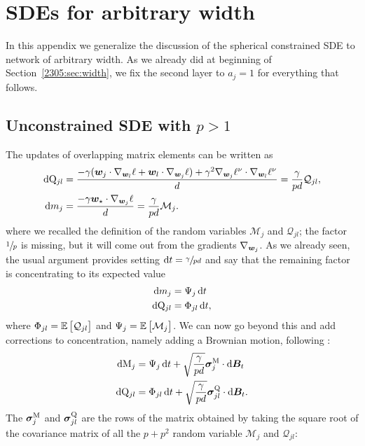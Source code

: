 \section{SDEs for arbitrary width}

\label{2305:app:SDE_with_generic_width}
In this appendix we generalize the discussion of the spherical constrained SDE to network of arbitrary width.
As we already did at beginning of Section~\ref{2305:sec:width}, we fix the second layer to \(a_j=1\) for everything that follows.
\subsection{Unconstrained SDE with \texorpdfstring{$p>1$}{p>1}}
The updates of overlapping matrix elements can be written as
\[\begin{split}
  \dif \Q_{jl} &= \frac{-\gamma (\w_j\cdot\nabla_{\w_l}{\ell}+\w_l\cdot\nabla_{\w_j}{\ell}) + \gamma^2\nabla_{\w_j}{\loss}\cdot\nabla_{\w_l}{\loss}}{d} = \frac{\gamma}{pd} \mathcal{Q}_{jl}, \\
  \dif m_{j} &= \frac{-\gamma \w_\star\cdot\nabla_{\w_j}\ell}{d}  = \frac{\gamma}{pd} \mathcal{M}_{j}.
\end{split}\]
where we recalled the definition of the random variables \(\mathcal{M}_{j}\) and \(\mathcal{Q}_{jl}\); the factor \(\sfrac1p\) is missing, but it will come out from the gradients \(\nabla_{{\boldsymbol{w}}_j}\).
As we already seen, the usual argument provides setting \(\dif t = \sfrac{\gamma}{pd}\) and say that the remaining factor is concentrating to its expected value
\[\begin{split}
    \dif m_{j} &= \Psi_{j} \dif t \\
    \dif \Q_{jl} &= \Phi_{jl} \dif t,
\end{split}\]
where \(\Phi_{jl} = \mathbb{E}\left[\mathcal{Q}_{jl}\right]\) and \(\Psi_{j} = \mathbb{E}\left[\mathcal{M}_{j}\right]\).
We can now go beyond this and add corrections to concentration, namely adding a Brownian motion, following \cite{arous2022high}:
\begin{equation}\label{2305:eq:SDE_p_generic}\begin{split}
    \dif \M_{j} &= \Psi_{j} \dif t + \sqrt{\frac{\gamma}{pd}}\vec{\sigma}^\M_{j}\cdot \dif \vec{B}_t \\
    \dif \Q_{jl} &= \Phi_{jl} \dif t + \sqrt{\frac{\gamma}{pd}}\vec{\sigma}^\Q_{jl}\cdot \dif \vec{B}_t.
\end{split}\end{equation}
The \({\boldsymbol{\sigma}}^{\mathrm{M}}_{j}\) and \({\boldsymbol{\sigma}}^{\mathrm{Q}}_{jl}\) are the rows of the matrix obtained by taking the square root of the covariance matrix of all the \(p+p^2\) random variable \(\mathcal{M}_{j}\) and \(\mathcal{Q}_{jl}\):
